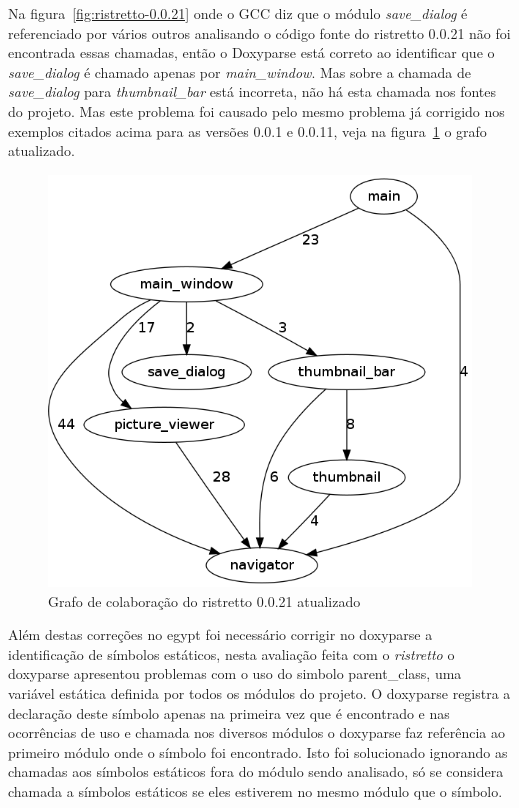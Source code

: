 Na figura~\ref{fig:ristretto-0.0.21} onde o GCC diz que o módulo {\it
save\_dialog} é referenciado por vários outros analisando o código fonte do
ristretto 0.0.21 não foi encontrada essas chamadas, então o Doxyparse está
correto ao identificar que o {\it save\_dialog} é chamado apenas por {\it
main\_window}. Mas sobre a chamada de {\it save\_dialog} para {\it
thumbnail\_bar} está incorreta, não há esta chamada nos fontes do projeto. Mas
este problema foi causado pelo mesmo problema já corrigido nos exemplos citados
acima para as versões 0.0.1 e 0.0.11, veja na
figura~\ref{fig:ristretto-0.0.21-doxyparse-2} o grafo atualizado.

\begin{figure}
\center
\includegraphics[scale=0.3]{imagens/ristretto-0_0_21-doxyparse-2}
\caption{Grafo de colaboração do ristretto 0.0.21 atualizado}
\label{fig:ristretto-0.0.21-doxyparse-2}
\end{figure}

Além destas correções no egypt foi necessário corrigir no doxyparse a
identificação de símbolos estáticos, nesta avaliação feita com o {\it
ristretto} o doxyparse apresentou problemas com o uso do simbolo parent\_class,
uma variável estática definida por todos os módulos do projeto. O doxyparse
registra a declaração deste símbolo apenas na primeira vez que é encontrado e
nas ocorrências de uso e chamada nos diversos módulos o doxyparse faz
referência ao primeiro módulo onde o símbolo foi encontrado. Isto foi
solucionado ignorando as chamadas aos símbolos estáticos fora do módulo sendo
analisado, só se considera chamada a símbolos estáticos se eles estiverem no
mesmo módulo que o símbolo.

